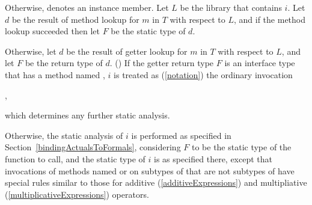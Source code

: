 \documentclass[makeidx]{article}
\begin{document}
{

\LMHash{}%
%
Otherwise,  denotes an instance member.
Let $L$ be the library that contains $i$.
Let $d$ be the result of method lookup for $m$ in $T$ with respect to $L$,
and if the method lookup succeeded then let $F$ be the static type of $d$.

\LMHash{}%
Otherwise, let $d$ be the result of getter lookup
for $m$ in $T$ with respect to $L$,
and let $F$ be the return type of $d$.
()
If the getter return type $F$ is an interface type
that has a method named \CALL,
$i$ is treated as
(\ref{notation})
the ordinary invocation

\noindent
{},

\noindent
which determines any further static analysis.

\LMHash{}%
Otherwise, the static analysis of $i$ is performed
as specified in Section~\ref{bindingActualsToFormals},
considering $F$ to be the static type of the function to call,
and the static type of $i$ is as specified there,
except that invocations of methods named 
or  on subtypes of  that are not subtypes of 
have special rules similar to those for additive (\ref{additiveExpressions})
and multipliative (\ref{multiplicativeExpressions}) operators.

}
\end{document}
